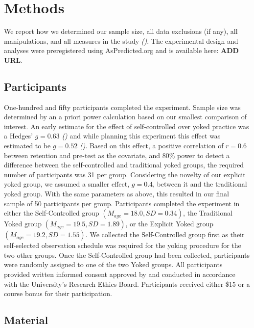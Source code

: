 \documentclass[
  english,
  jou]{apa7}
\begin{document}
\hypertarget{methods}{%
\section{Methods}\label{methods}}

We report how we determined our sample size, all data exclusions (if any), all manipulations, and all measures in the study \emph{()}. The experimental design and analyses were preregistered using AsPredicted.org and is available here: \textbf{ADD URL}.

\hypertarget{participants}{%
\subsection{Participants}\label{participants}}

One-hundred and fifty participants completed the experiment. Sample size was determined by an a priori power calculation based on our smallest comparison of interest. An early estimate for the effect of self-controlled over yoked practice was a Hedges' \(g = 0.63\) \emph{()} and while planning this experiment this effect was estimated to be \(g = 0.52\) \emph{()}. Based on this effect, a positive correlation of \(r = 0.6\) between retention and pre-test as the covariate, and 80\% power to detect a difference between the self-controlled and traditional yoked groups, the required number of participants was 31 per group. Considering the novelty of our explicit yoked group, we assumed a smaller effect, \(g = 0.4\), between it and the traditional yoked group. With the same parameters as above, this resulted in our final sample of 50 participants per group. Participants completed the experiment in either the Self-Controlled group \((M_{age} = 18.0, SD = 0.34)\), the Traditional Yoked group \((M_{age} = 19.5, SD = 1.89)\), or the Explicit Yoked group \((M_{age} = 19.2, SD = 1.55)\). We collected the Self-Controlled group first as their self-selected observation schedule was required for the yoking procedure for the two other groups. Once the Self-Controlled group had been collected, participants were randomly assigned to one of the two Yoked groups. All participants provided written informed consent approved by and conducted in accordance with the University's Research Ethics Board. Participants received either \$15 or a course bonus for their participation.

\hypertarget{material}{%
\subsection{Material}\label{material}}
\end{document}
